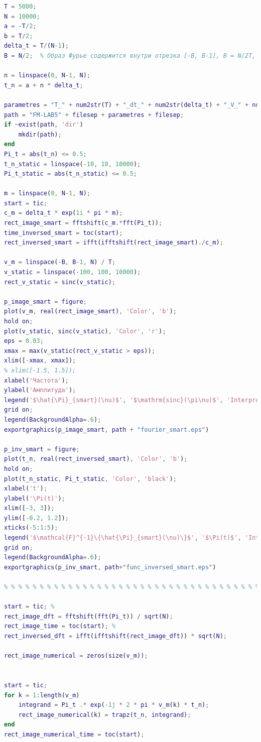 \documentclass[a4paper]{article}
\begin{document}
\begin{lstlisting}[caption={Код для построения графиков для пункта 1.3}, language=matlab]
T = 5000;
N = 10000;
a = -T/2;
b = T/2;
delta_t = T/(N-1);
B = N/2;  % Образ Фурье содержится внутри отрезка [-B, B-1], B = N/2T, и при остальных не сходится с реальным образом

n = linspace(0, N-1, N);
t_n = a + n * delta_t;

parametres = "T_" + num2str(T) + "_dt_" + num2str(delta_t) + "_V_" + num2str((B*2)/T) + "_dv_" + num2str((B*2)/(T*N));
path = "FM-LAB5" + filesep + parametres + filesep;
if ~exist(path, 'dir')
    mkdir(path);
end
Pi_t = abs(t_n) <= 0.5;
t_n_static = linspace(-10, 10, 10000);
Pi_t_static = abs(t_n_static) <= 0.5;

m = linspace(0, N-1, N);
start = tic;
c_m = delta_t * exp(1i * pi * m);
rect_image_smart = fftshift(c_m.*fft(Pi_t));
time_inversed_smart = toc(start);
rect_inversed_smart = ifft(ifftshift(rect_image_smart)./c_m);

v_m = linspace(-B, B-1, N) / T;
v_static = linspace(-100, 100, 10000);
rect_v_static = sinc(v_static);

p_image_smart = figure;
plot(v_m, real(rect_image_smart), 'Color', 'b');
hold on;
plot(v_static, sinc(v_static), 'Color', 'r');
eps = 0.03;
xmax = max(v_static(rect_v_static > eps));
xlim([-xmax, xmax]);
% xlim([-1.5, 1.5]);
xlabel('Частота');
ylabel('Амплитуда');
legend('$\hat{\Pi}_{smart}(\nu)$', '$\mathrm{sinc}(\pi\nu)$', 'Interpreter', 'latex', 'fontsize', 12)
grid on;
legend(BackgroundAlpha=.6);
exportgraphics(p_image_smart, path + "fourier_smart.eps")

p_inv_smart = figure;
plot(t_n, real(rect_inversed_smart), 'Color', 'b');
hold on;
plot(t_n_static, Pi_t_static, 'Color', 'black');
xlabel('t');
ylabel('\Pi(t)');
xlim([-3, 3]);
ylim([-0.2, 1.2]);
xticks(-5:1:5);
legend('$\mathcal{F}^{-1}\{\hat{\Pi}_{smart}(\nu)\}$', '$\Pi(t)$', 'Interpreter', 'latex', 'fontsize', 12)
grid on;
legend(BackgroundAlpha=.6);
exportgraphics(p_inv_smart, path+"func_inversed_smart.eps")

% % % % % % % % % % % % % % % % % % % % % % % % % % % % % % % % % % % % % %

start = tic; %
rect_image_dft = fftshift(fft(Pi_t)) / sqrt(N);
rect_image_time = toc(start); %
rect_inversed_dft = ifft(ifftshift(rect_image_dft)) * sqrt(N);

rect_image_numerical = zeros(size(v_m));


start = tic;
for k = 1:length(v_m)
    integrand = Pi_t .* exp(-1j * 2 * pi * v_m(k) * t_n);
    rect_image_numerical(k) = trapz(t_n, integrand);
end
rect_image_numerical_time = toc(start);


\end{lstlisting}
\end{document}

